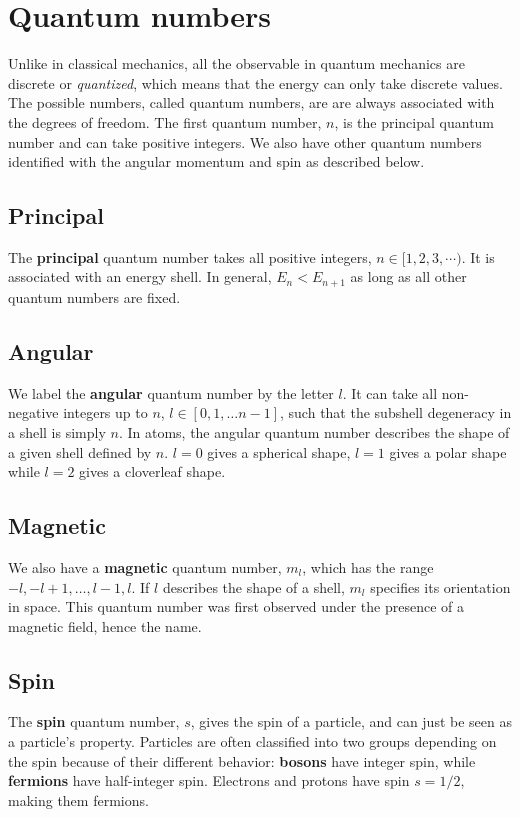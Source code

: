 \section{Quantum numbers}
Unlike in classical mechanics, all the observable in quantum mechanics are discrete or \textit{quantized}, which means that the energy can only take discrete values. The possible numbers, called quantum numbers, are are always associated with the degrees of freedom. The first quantum number, $n$, is the principal quantum number and can take positive integers. We also have other quantum numbers identified with the angular momentum and spin as described below.

\subsection*{Principal}
The \textbf{principal} quantum number takes all positive integers, $n\in[1,2,3,\cdots)$. It is associated with an energy shell. In general, $E_n<E_{n+1}$ as long as all other quantum numbers are fixed. 

\subsection*{Angular}
We label the \textbf{angular} quantum number by the letter $l$. It can take all non-negative integers up to $n$, $l\in[0,1,\hdots n-1]$, such that the subshell degeneracy in a shell is simply $n$. In atoms, the angular quantum number describes the shape of a given shell defined by $n$. $l=0$ gives a spherical shape, $l=1$ gives a polar shape while $l=2$ gives a cloverleaf shape. 

\subsection*{Magnetic}
We also have a \textbf{magnetic} quantum number, $m_l$, which has the range $-l,-l+1,\hdots,l-1,l$. If $l$ describes the shape of a shell, $m_l$ specifies its orientation in space. This quantum number was first observed under the presence of a magnetic field, hence the name.

\subsection*{Spin}
The \textbf{spin} quantum number, $s$, gives the spin of a particle, and can just be seen as a particle's property. Particles are often classified into two groups depending on the spin because of their different behavior: \textbf{bosons} have integer spin, while \textbf{fermions} have half-integer spin. Electrons and protons have spin $s=1/2$, making them fermions.

